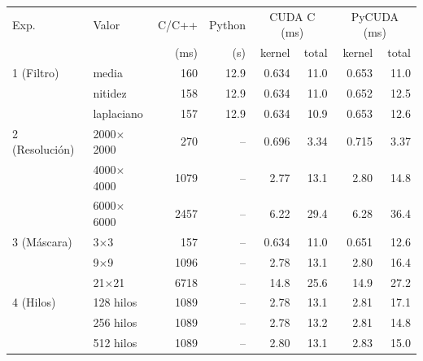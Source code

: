 \begin{tabular}{llrrrrrr}
\toprule
Exp. & Valor & C/C++ & Python & \multicolumn{2}{c}{CUDA C (ms)} & \multicolumn{2}{c}{PyCUDA (ms)} \\
 & & (ms) & (s) & kernel & total & kernel & total \\
\midrule
1 (Filtro) & media & 160 & 12.9 & 0.634 & 11.0 & 0.653 & 11.0 \\
 & nitidez & 158 & 12.9 & 0.634 & 11.0 & 0.652 & 12.5 \\
 & laplaciano & 157 & 12.9 & 0.634 & 10.9 & 0.653 & 12.6 \\
\midrule
2 (Resolución) & 2000$\times$2000 & 270 & -- & 0.696 & 3.34 & 0.715 & 3.37 \\
 & 4000$\times$4000 & 1079 & -- & 2.77 & 13.1 & 2.80 & 14.8 \\
 & 6000$\times$6000 & 2457 & -- & 6.22 & 29.4 & 6.28 & 36.4 \\
\midrule
3 (Máscara) & 3$\times$3 & 157 & -- & 0.634 & 11.0 & 0.651 & 12.6 \\
 & 9$\times$9 & 1096 & -- & 2.78 & 13.1 & 2.80 & 16.4 \\
 & 21$\times$21 & 6718 & -- & 14.8 & 25.6 & 14.9 & 27.2 \\
\midrule
4 (Hilos) & 128 hilos & 1089 & -- & 2.78 & 13.1 & 2.81 & 17.1 \\
 & 256 hilos & 1089 & -- & 2.78 & 13.2 & 2.81 & 14.8 \\
 & 512 hilos & 1089 & -- & 2.80 & 13.1 & 2.83 & 15.0 \\
\bottomrule
\end{tabular}
